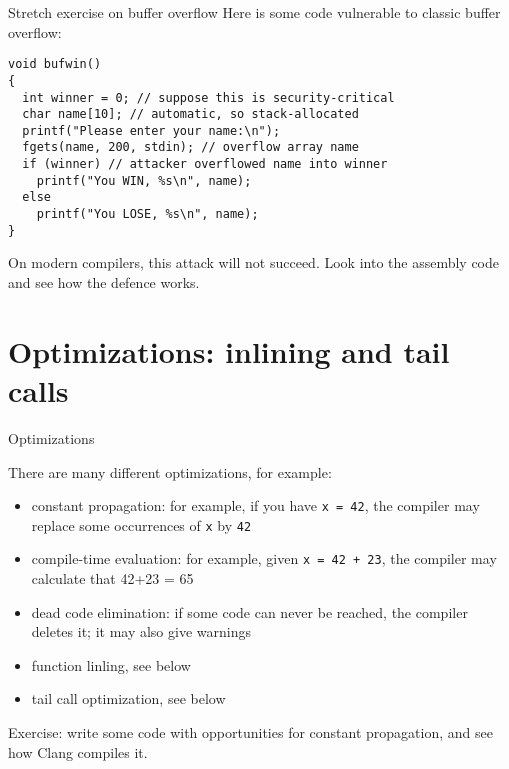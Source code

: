 \documentclass[landscape]{beamer}
\begin{document}
\begin{frame}[fragile]{Stretch exercise on buffer overflow}
Here is some code vulnerable to classic buffer overflow:
\begin{verbatim}
void bufwin()
{
  int winner = 0; // suppose this is security-critical
  char name[10]; // automatic, so stack-allocated  
  printf("Please enter your name:\n");
  fgets(name, 200, stdin); // overflow array name
  if (winner) // attacker overflowed name into winner
    printf("You WIN, %s\n", name);
  else
    printf("You LOSE, %s\n", name);
}
\end{verbatim}
On modern compilers, this attack will not succeed. Look into the assembly code and see how the defence works.
\end{frame}



\section{Optimizations: inlining and tail calls}


\begin{frame}{Optimizations}

There are many different optimizations, for example:

\begin{itemize}
\item constant propagation: for example, if you have \texttt{x = 42}, the compiler may replace some occurrences of \texttt x  by \texttt{42}
\item compile-time evaluation: for example, given \texttt{x = 42 + 23}, the compiler may 
calculate that 42+23 = 65
\item dead code elimination: if some code can never be reached, the compiler deletes it; it may also give warnings
\item function linling, see below 
\item tail call optimization, see below
\end{itemize}

Exercise: write some code with opportunities for constant propagation, and see how Clang compiles it.
\end{frame}
\end{document}

